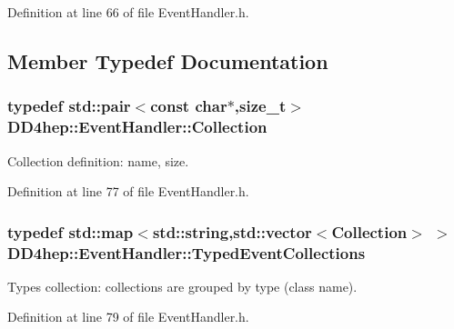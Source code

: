 Definition at line 66 of file EventHandler.h.

\subsection{Member Typedef Documentation}
\hypertarget{class_d_d4hep_1_1_event_handler_abc271087910b2013962fa4a83d4f349e}{
\subsubsection[{Collection}]{\setlength{\rightskip}{0pt plus 5cm}typedef std::pair$<$const char$\ast$,size\_\-t$>$ {\bf DD4hep::EventHandler::Collection}}}
\label{class_d_d4hep_1_1_event_handler_abc271087910b2013962fa4a83d4f349e}


Collection definition: name, size. 

Definition at line 77 of file EventHandler.h.\hypertarget{class_d_d4hep_1_1_event_handler_a4d441ff8a824b1e2f278e8b7a6391af3}{
\subsubsection[{TypedEventCollections}]{\setlength{\rightskip}{0pt plus 5cm}typedef std::map$<$std::string,std::vector$<${\bf Collection}$>$ $>$ {\bf DD4hep::EventHandler::TypedEventCollections}}}
\label{class_d_d4hep_1_1_event_handler_a4d441ff8a824b1e2f278e8b7a6391af3}


Types collection: collections are grouped by type (class name). 

Definition at line 79 of file EventHandler.h.


